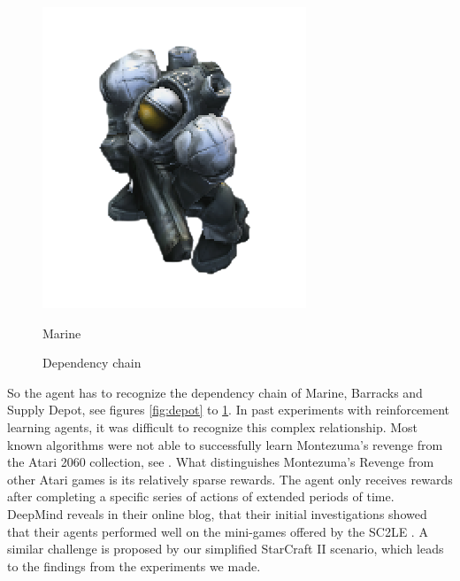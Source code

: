 \documentclass[12pt,a4paper]{article}
\begin{document}
\begin{figure}
    \endminipage\hfill
    \includegraphics[width=\linewidth]{Figures/marine.png}
    \caption*{Marine}\label{fig:marine}
    \endminipage
    \caption{Dependency chain}
\end{figure}
So the agent has to recognize the dependency chain of Marine, Barracks and Supply Depot, see figures \ref{fig:depot} to \ref{fig:marine}. In past experiments with reinforcement learning agents, it was difficult to recognize this complex relationship. Most known algorithms were not able to successfully learn Montezuma's revenge from the Atari 2060 collection, see \cite{DBLP:journals/corr/abs-1805-11592}. What distinguishes Montezuma's Revenge from other Atari games is its relatively sparse rewards. The agent only receives rewards after completing a specific series of actions of extended periods of time. DeepMind reveals in their online blog, that their initial investigations showed that their agents performed well on the mini-games offered by the SC2LE \cite{DeepMindBlog2017}.
A similar challenge is proposed by our simplified StarCraft II scenario, which leads to the findings from the experiments we made.
\end{document}
